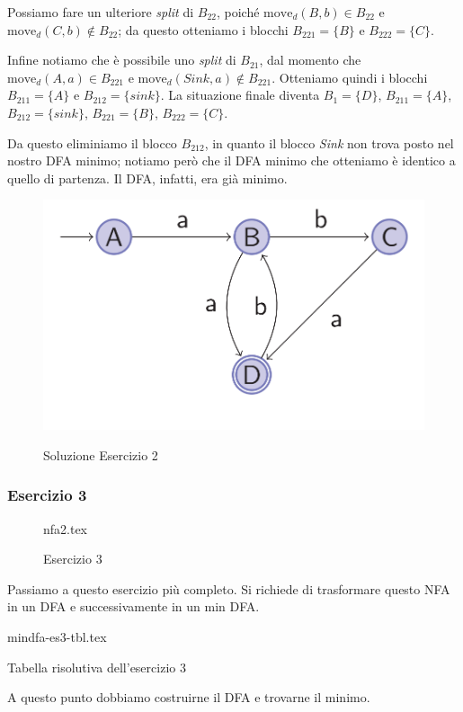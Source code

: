 \documentclass[class=book, crop=false, oneside, 12pt]{standalone}
\begin{document}
Possiamo fare un ulteriore \emph{split} di \(B_{22}\), poiché \(\textrm{move}_{d}(B,b) \in B_{22} \) e \(\textrm{move}_{d}(C,b) \notin B_{22} \); da questo otteniamo i blocchi \(B_{221}=\{B\}\) e \(B_{222}=\{C\}\).

Infine notiamo che è possibile uno \emph{split} di \(B_{21}\), dal momento che \(\textrm{move}_{d}(A,a) \in B_{221} \) e \(\textrm{move}_{d}(Sink,a) \notin B_{221} \). Otteniamo quindi i blocchi \(B_{211}=\{A\}\) e \(B_{212}=\{sink\}\).
La situazione finale diventa \(B_{1}=\{D\}\), \(B_{211}=\{A\}\), \(B_{212}=\{sink\}\), \(B_{221}=\{B\}\), \(B_{222}=\{C\}\).

Da questo eliminiamo il blocco \(B_{212}\), in quanto il blocco \emph{Sink} non trova posto nel nostro DFA minimo; notiamo però che il DFA minimo che otteniamo è identico a quello di partenza. Il DFA, infatti, era già minimo.  

\begin{figure}[H]
	\centering
	\includegraphics[width=.8\textwidth,keepaspectratio]{dfa_grafo_2.png}
	\label{mindfa-es-2-sol}
	\caption{Soluzione Esercizio 2}
\end{figure}

\subsubsection{Esercizio 3}
\begin{figure}[htb]
	\centering
    {nfa2.tex}
	\label{mindfa-es-3}
	\caption{Esercizio 3}
\end{figure}

Passiamo a questo esercizio più completo. Si richiede di trasformare questo NFA in un DFA e successivamente in un min DFA.

\begin{table}[H]
	\centering
	{mindfa-es3-tbl.tex}
	\label{mindfa-es-3-tab}
	\caption{Tabella risolutiva dell'esercizio \(3\)}
\end{table}

\noindent A questo punto dobbiamo costruirne il DFA e trovarne il minimo.
\end{document}
